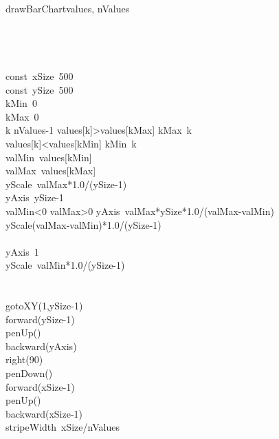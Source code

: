 \documentclass[a4paper,10pt]{article}
\begin{document}
\begin{pseudocode}{drawBarChart}{values, nValues }
\label{drawBarChart}
\\
\\
\\
\\
  \\
  const\ xSize\gets\ 500\\
  const\ ySize\gets\ 500\\
  kMin\gets\ 0\\
  kMax\gets\ 0\\
  \FOR k  \TO nValues-1  \DO
    \IF values[k]>values[kMax] \THEN
      kMax\gets\ k\\
    \ELSE
      \IF values[k]<values[kMin] \THEN
        kMin\gets\ k\\
  valMin\gets\ values[kMin]\\
  valMax\gets\ values[kMax]\\
  yScale\gets\ valMax*1.0/(ySize-1)\\
  yAxis\gets\ ySize-1\\
  \IF valMin<0 \THEN
    \IF valMax>0 \THEN
    \BEGIN
      yAxis\gets\ valMax*ySize*1.0/(valMax-valMin)\\
      yScale\gets(valMax-valMin)*1.0/(ySize-1)\\
    \END\\
    \ELSE
    \BEGIN
      yAxis\gets\ 1\\
      yScale\gets\ valMin*1.0/(ySize-1)\\
    \END\\
  \\
  gotoXY(1,ySize-1)\\
  forward(ySize-1)\\
  penUp()\\
  backward(yAxis)\\
  right(90)\\
  penDown()\\
  forward(xSize-1)\\
  penUp()\\
  backward(xSize-1)\\
  stripeWidth\gets\ xSize/nValues\\

\end{pseudocode}
\end{document}
